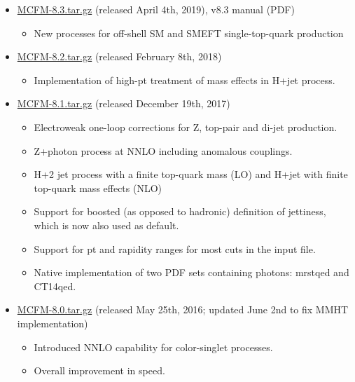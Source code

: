 \label{priorversions}
\begin{itemize}
\item \href{https://mcfm.fnal.gov/downloads/MCFM-8.3.tar.gz}{MCFM-8.3.tar.gz} (released April 4th, 2019), v8.3 manual (PDF)

\begin{itemize}
\item    New processes for off-shell SM and SMEFT single-top-quark production
\end{itemize}

\item \href{https://mcfm.fnal.gov/downloads/MCFM-8.2.tar.gz}{MCFM-8.2.tar.gz} (released February 8th, 2018)

\begin{itemize}
\item    Implementation of high-pt treatment of mass effects in H+jet process.
\end{itemize}

\item \href{https://mcfm.fnal.gov/downloads/MCFM-8.1.tar.gz}{MCFM-8.1.tar.gz} (released December 19th, 2017)

\begin{itemize}
\item    Electroweak one-loop corrections for Z, top-pair and di-jet production.
\item    Z+photon process at NNLO including anomalous couplings.
\item    H+2 jet process with a finite top-quark mass (LO) and H+jet with finite top-quark mass effects (NLO)
\item    Support for boosted (as opposed to hadronic) definition of jettiness, which is now also used as default.
\item    Support for pt and rapidity ranges for most cuts in the input file.
\item    Native implementation of two PDF sets containing photons: mrstqed and CT14qed.
\end{itemize}

\item \href{https://mcfm.fnal.gov/downloads/MCFM-8.0.tar.gz}{MCFM-8.0.tar.gz} (released May 25th, 2016; updated June 2nd to fix MMHT implementation)

\begin{itemize}
\item    Introduced NNLO capability for color-singlet processes.
\item    Overall improvement in speed.
\end{itemize}
\end{itemize}

